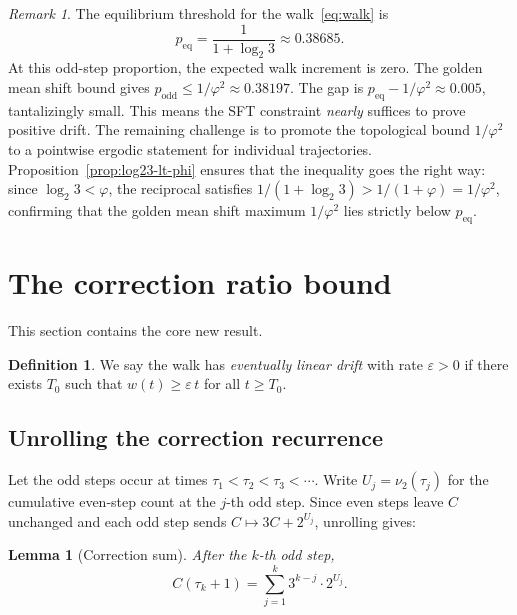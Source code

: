 \documentclass[manuscript]{aomart}
\theoremstyle{plain}
\newtheorem{lemma}[theorem]{Lemma}
\theoremstyle{definition}
\newtheorem{definition}[theorem]{Definition}
\theoremstyle{remark}
\newtheorem{remark}[theorem]{Remark}
\numberwithin{equation}{section}
\begin{document}
\begin{remark}\label{rem:near-miss}
The equilibrium threshold for the walk~\eqref{eq:walk} is
\[
  p_{\mathrm{eq}} = \frac{1}{1 + \log_2 3} \approx 0.38685.
\]
At this odd-step proportion, the expected walk increment is zero.  The
golden mean shift bound gives
$p_{\mathrm{odd}} \le 1/\varphi^2 \approx 0.38197$.  The gap is
$p_{\mathrm{eq}} - 1/\varphi^2 \approx 0.005$, tantalizingly small.
This means the SFT constraint \emph{nearly} suffices to prove
positive drift.  The remaining challenge is to promote the topological
bound $1/\varphi^2$ to a pointwise ergodic statement for individual
trajectories.  Proposition~\ref{prop:log23-lt-phi} ensures that the
inequality goes the right way: since $\log_2 3 < \varphi$, the
reciprocal satisfies $1/(1+\log_2 3) > 1/(1+\varphi) = 1/\varphi^2$,
confirming that the golden mean shift maximum $1/\varphi^2$ lies
strictly below $p_{\mathrm{eq}}$.
\end{remark}

\section{The correction ratio bound}\label{sec:correction}

This section contains the core new result.

\begin{definition}\label{def:linear-drift}
We say the walk has \emph{eventually linear drift} with rate
$\varepsilon > 0$ if there exists $T_0$ such that
$w(t) \ge \varepsilon\,t$ for all $t \ge T_0$.
\end{definition}

\subsection{Unrolling the correction recurrence}

Let the odd steps occur at times $\tau_1 < \tau_2 < \tau_3 < \cdots$.
Write $U_j = \nu_2(\tau_j)$ for the cumulative even-step count at the
$j$-th odd step.  Since even steps leave $C$ unchanged and each odd
step sends $C \mapsto 3C + 2^{U_j}$, unrolling gives:

\begin{lemma}[Correction sum]\label{lem:C-sum}
After the $k$-th odd step,
\begin{equation}\label{eq:C-sum}
  C(\tau_k + 1) = \sum_{j=1}^{k} 3^{k-j} \cdot 2^{U_j}.
\end{equation}
\end{lemma}
\end{document}
